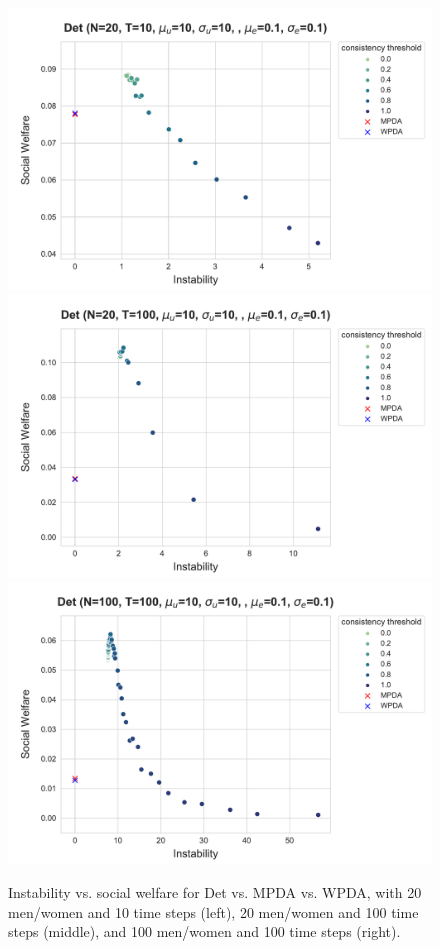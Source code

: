 \begin{figure}
    \centering
    \includegraphics[width=0.32\linewidth]{figures/algs/Det_sw_20_10_10_10.pdf}
    \includegraphics[width=0.32\linewidth]{figures/algs/Det_sw_20_100_10_10.pdf}
    \includegraphics[width=0.32\linewidth]{figures/algs/Det_sw_100_100_10_10.pdf}
    \caption{Instability vs. social welfare for Det vs. MPDA vs. WPDA, with 20 men/women and 10 time steps (left), 20 men/women and 100 time steps (middle), and 100 men/women and 100 time steps (right).}
    \label{fig:det-stability}
\end{figure}